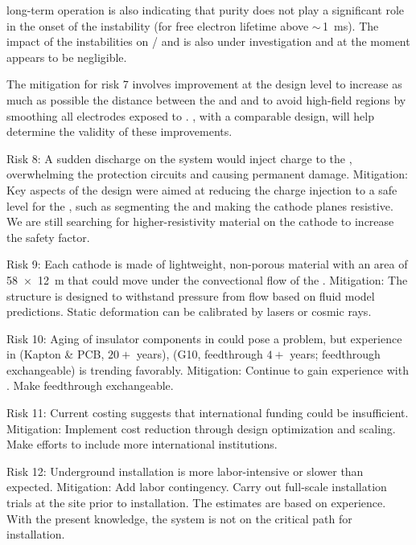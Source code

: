  long-term operation is also indicating that  purity does not  play a significant role in the onset of the  instability (for free electron lifetime above $\sim\,$\SI{1}{ms}).  The impact of the  instabilities on / and  is also under investigation and at the moment appears to be negligible.

The mitigation for risk 7 involves improvement at the design level to increase as much as possible the distance between the  and  and to avoid high-field regions by smoothing all electrodes exposed to .  %
, with a comparable design, will help determine %
the validity of these improvements.

Risk 8: A sudden discharge on the  system would inject charge to the  , overwhelming the protection circuits and causing permanent damage. Mitigation: Key aspects of the  design were aimed at reducing the charge injection to a safe level for the , such as segmenting the  and making the cathode planes resistive.  We are still searching for higher-resistivity material on the cathode to increase the safety factor. 

Risk 9:  Each cathode is made of lightweight, non-porous material with an area of \SI{58x12}{m} that could move under the  convectional flow of the .  Mitigation: The  structure is designed to withstand pressure from  flow based on fluid model predictions. Static deformation can be calibrated by lasers or cosmic rays.

Risk 10: Aging of insulator components in  could %
pose a problem,  but  experience in  (Kapton \& PCB, $20+$ years),  (G10, feedthrough $4+$ years; feedthrough exchangeable) is trending favorably. Mitigation: %
Continue to gain experience with . Make feedthrough exchangeable.

Risk 11: Current costing suggests that international funding could be %
insufficient. Mitigation: Implement cost reduction through design optimization and scaling. Make efforts to include more international %
institutions. 

Risk 12: Underground installation is more labor-intensive or slower than expected. Mitigation: Add labor contingency. Carry out full-scale installation trials at the   site prior to installation. The estimates are based on  experience. With the present knowledge, the  system is not on the critical path for installation.


